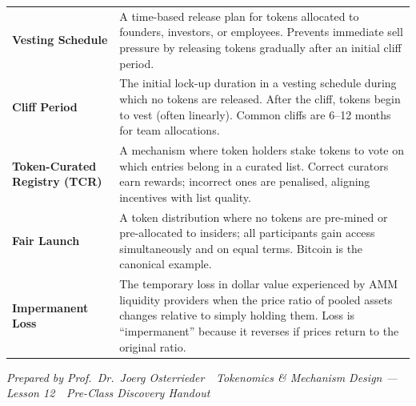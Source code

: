 \documentclass[11pt,a4paper]{article}
\begin{document}
\begin{tabular}{@{}p{3.8cm}p{10.8cm}@{}}
\textbf{Vesting Schedule}         & A time-based release plan for tokens allocated to founders, investors, or employees. Prevents immediate sell pressure by releasing tokens gradually after an initial cliff period. \\
\textbf{Cliff Period}             & The initial lock-up duration in a vesting schedule during which no tokens are released. After the cliff, tokens begin to vest (often linearly). Common cliffs are 6--12 months for team allocations. \\
\textbf{Token-Curated Registry (TCR)} & A mechanism where token holders stake tokens to vote on which entries belong in a curated list. Correct curators earn rewards; incorrect ones are penalised, aligning incentives with list quality. \\
\textbf{Fair Launch}              & A token distribution where no tokens are pre-mined or pre-allocated to insiders; all participants gain access simultaneously and on equal terms. Bitcoin is the canonical example. \\
\textbf{Impermanent Loss}         & The temporary loss in dollar value experienced by AMM liquidity providers when the price ratio of pooled assets changes relative to simply holding them. Loss is ``impermanent'' because it reverses if prices return to the original ratio. \\
\bottomrule
\end{tabular}

\vspace{6pt}
\noindent\textcolor{mlgray}{\small\textit{Prepared by Prof.\ Dr.\ Joerg Osterrieder \,\textbullet\, Tokenomics \& Mechanism Design --- Lesson 12 \,\textbullet\, Pre-Class Discovery Handout}}
\end{document}
